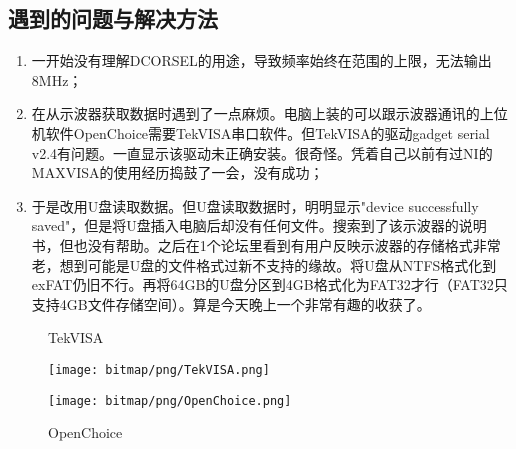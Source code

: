 \subsection{遇到的问题与解决方法}
\begin{enumerate}
	\item 一开始没有理解DCORSEL的用途，导致频率始终在范围的上限，无法输出8MHz；
	\item 在从示波器获取数据时遇到了一点麻烦。电脑上装的可以跟示波器通讯的上位机软件OpenChoice需要TekVISA串口软件。但TekVISA的驱动gadget serial v2.4有问题。一直显示该驱动未正确安装。很奇怪。凭着自己以前有过NI的MAXVISA的使用经历捣鼓了一会，没有成功；
	\item 于是改用U盘读取数据。但U盘读取数据时，明明显示"device successfully saved"，但是将U盘插入电脑后却没有任何文件。搜索到了该示波器的说明书，但也没有帮助。之后在1个论坛里看到有用户反映示波器的存储格式非常老，想到可能是U盘的文件格式过新不支持的缘故。将U盘从NTFS格式化到exFAT仍旧不行。再将64GB的U盘分区到4GB格式化为FAT32才行（FAT32只支持4GB文件存储空间）。算是今天晚上一个非常有趣的收获了。
\end{enumerate}
\begin{figure}[htbp]
	\centering
	\begin{minipage}[htbp]{7.5cm}
		\centering
		\caption{TekVISA}
		\label{TekVISA}
		\texttt{[image: bitmap/png/TekVISA.png]}
	\end{minipage}
	\begin{minipage}[htbp]{7.5cm}
		\centering
		\caption{OpenChoice}
		\label{OpenChoice}
		\texttt{[image: bitmap/png/OpenChoice.png]}
	\end{minipage}
\end{figure}
